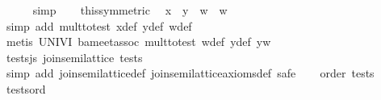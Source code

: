 \begin{isabellebody}
\ \ \ \ \isamarkupfalse%
\ simp\isanewline
\ \ \isamarkupfalse%
\ this{}symmetric{}\ \isamarkupfalse%
\ {}{}x\ {}\ y{}\ {}\ w\ {}\ w{}\isanewline
\ \ \ \ \isamarkupfalse%
\ {}simp\ add{}\ mult{}to{}test\ x{}{}def\ y{}{}def\ w{}{}def{}\isanewline
\ \ \ \ \isamarkupfalse%
\ {}metis\ UNIV{}I\ ba{}meet{}assoc\ mult{}to{}test\ w{}{}def\ y{}{}def\ yw{}\isanewline
{}\isamarkupfalse%
%
\endisatagproof
{\isafoldproof}%
%
\isadelimproof
\isanewline
%
\endisadelimproof
\isanewline
{}\isamarkupfalse%
\ tests{}js{}\ {}join{}semilattice\ tests{}\isanewline
%
\isadelimproof
%
\endisadelimproof
%
\isatagproof
{}\isamarkupfalse%
\ {}simp\ add{}\ join{}semilattice{}def\ join{}semilattice{}axioms{}def{}\ safe{}\isanewline
\ \ \isamarkupfalse%
\ {}order\ tests{}\ \isamarkupfalse%
\ tests{}ord\ \isamarkupfalse%

\end{isabellebody}
